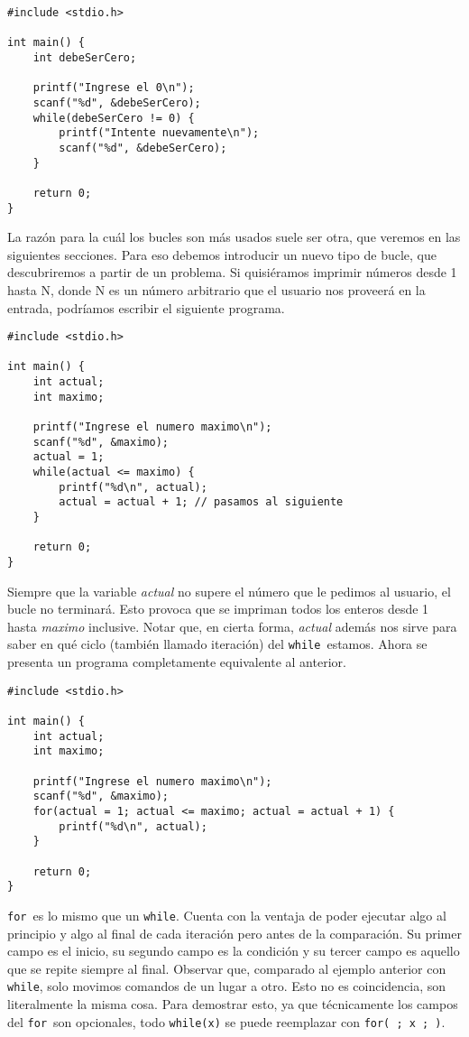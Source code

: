 \documentclass[10pt]{article}
\newcommand{\cwhile}[0]{\lstinline{while}}
\newcommand{\cfor}[0]{\lstinline{for}}
\begin{document}
\begin{lstlisting}
#include <stdio.h>

int main() {
	int debeSerCero;

	printf("Ingrese el 0\n");
	scanf("%d", &debeSerCero);
	while(debeSerCero != 0) {
		printf("Intente nuevamente\n");
		scanf("%d", &debeSerCero);
	}

	return 0;
}
\end{lstlisting}

La razón para la cuál los bucles son más usados suele ser otra, que veremos en las siguientes secciones. Para eso debemos introducir un nuevo tipo de bucle, que descubriremos a partir de un problema. Si quisiéramos imprimir números desde 1 hasta N, donde N es un número arbitrario que el usuario nos proveerá en la entrada, podríamos escribir el siguiente programa.

\begin{lstlisting}
#include <stdio.h>

int main() {
	int actual;
	int maximo;

	printf("Ingrese el numero maximo\n");
	scanf("%d", &maximo);
	actual = 1;
	while(actual <= maximo) {
		printf("%d\n", actual);
		actual = actual + 1; // pasamos al siguiente
	}

	return 0;
}
\end{lstlisting}

Siempre que la variable \textit{actual} no supere el número que le pedimos al usuario, el bucle no terminará. Esto provoca que se impriman todos los enteros desde 1 hasta \textit{maximo} inclusive. Notar que, en cierta forma, \textit{actual} además nos sirve para saber en qué ciclo (también llamado iteración) del \cwhile\ estamos. Ahora se presenta un programa completamente equivalente al anterior.

\begin{lstlisting}
#include <stdio.h>

int main() {
	int actual;
	int maximo;

	printf("Ingrese el numero maximo\n");
	scanf("%d", &maximo);
	for(actual = 1; actual <= maximo; actual = actual + 1) {
		printf("%d\n", actual);
	}

	return 0;
}
\end{lstlisting}

\cfor\ es lo mismo que un \cwhile. Cuenta con la ventaja de poder ejecutar algo al principio y algo al final de cada iteración pero antes de la comparación. Su primer campo es el inicio, su segundo campo es la condición y su tercer campo es aquello que se repite siempre al final. Observar que, comparado al ejemplo anterior con \cwhile, solo movimos comandos de un lugar a otro. Esto no es coincidencia, son literalmente la misma cosa. Para demostrar esto, ya que técnicamente los campos del \cfor\ son opcionales, todo \lstinline{while(x)} se puede reemplazar con \lstinline{for( ; x ; )}.
\end{document}
